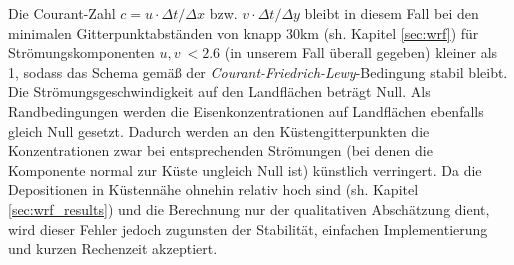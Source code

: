 \documentclass[12pt,a4paper,onecolumn]{scrartcl}
\begin{document}
Die Courant-Zahl $c = u \cdot \Delta t / \Delta x$ bzw. $v \cdot \Delta t / \Delta y$ bleibt in diesem Fall bei den minimalen Gitterpunktabständen von knapp 30km (sh. Kapitel \ref{sec:wrf}) für Strömungskomponenten $u,v \ < 2.6$ (in unserem Fall überall gegeben) kleiner als 1, sodass das Schema gemäß der \textit{Courant-Friedrich-Lewy}-Bedingung stabil bleibt. Die Strömungsgeschwindigkeit auf den Landflächen beträgt Null. Als Randbedingungen werden die Eisenkonzentrationen auf Landflächen ebenfalls gleich Null gesetzt. Dadurch werden an den Küstengitterpunkten die Konzentrationen zwar bei entsprechenden Strömungen (bei denen die Komponente normal zur Küste ungleich Null ist) künstlich verringert. Da die Depositionen in Küstennähe ohnehin relativ hoch sind (sh. Kapitel \ref{sec:wrf_results}) und die Berechnung nur der qualitativen Abschätzung dient, wird dieser Fehler jedoch zugunsten der Stabilität, einfachen Implementierung und kurzen Rechenzeit akzeptiert.
\end{document}
